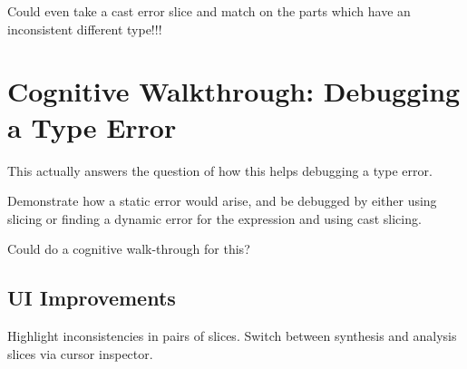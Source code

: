 Could even take a cast error slice and match on the parts which have an inconsistent different type!!!

\section{Cognitive Walkthrough: Debugging a Type Error}
\label{sec:CognitiveWalkthrough}
This actually answers the question of how this helps debugging a type error.

Demonstrate how a static error would arise, and be debugged by either using slicing or finding a dynamic error for the expression and using cast slicing.

Could do a cognitive walk-through for this?

\subsection{UI Improvements}
Highlight inconsistencies in pairs of slices.
Switch between synthesis and analysis slices via cursor inspector.
